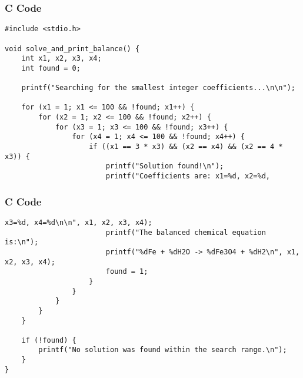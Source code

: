 \documentclass{beamer}
\begin{document}
\begin{frame}[fragile]
    \frametitle{C Code}

    \begin{lstlisting}
#include <stdio.h>

void solve_and_print_balance() {
    int x1, x2, x3, x4;
    int found = 0;

    printf("Searching for the smallest integer coefficients...\n\n");

    for (x1 = 1; x1 <= 100 && !found; x1++) {
        for (x2 = 1; x2 <= 100 && !found; x2++) {
            for (x3 = 1; x3 <= 100 && !found; x3++) {
                for (x4 = 1; x4 <= 100 && !found; x4++) {
                    if ((x1 == 3 * x3) && (x2 == x4) && (x2 == 4 * x3)) {
                        printf("Solution found!\n");
                        printf("Coefficients are: x1=%d, x2=%d, 
    \end{lstlisting}
\end{frame}


\begin{frame}[fragile]
    \frametitle{C Code}
    \begin{lstlisting}
x3=%d, x4=%d\n\n", x1, x2, x3, x4);
                        printf("The balanced chemical equation is:\n");
                        printf("%dFe + %dH2O -> %dFe3O4 + %dH2\n", x1, x2, x3, x4);
                        found = 1;
                    }
                }
            }
        }
    }

    if (!found) {
        printf("No solution was found within the search range.\n");
    }
}


    \end{lstlisting}
\end{frame}
\end{document}
